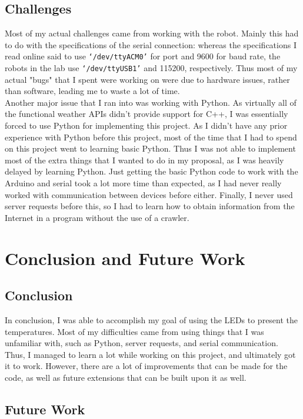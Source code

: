\documentclass[12pt]{article}
\begin{document}
\subsection{Challenges}
Most of my actual challenges came from working with the robot. Mainly this had to do with the specifications of the serial connection: whereas the specifications I read online said to use \texttt{`/dev/ttyACM0'} for port and 9600 for baud rate, the robots in the lab use \texttt{`/dev/ttyUSB1'} and 115200, respectively. Thus most of my actual "bugs" that I spent were working on were due to hardware issues, rather than software, leading me to waste a lot of time.\\
\indent Another major issue that I ran into was working with Python. As virtually all of the functional weather APIs didn't provide support for C++, I was essentially forced to use Python for implementing this project. As I didn't have any prior experience with Python before this project, most of the time that I had to spend on this project went to learning basic Python. Thus I was not able to implement most of the extra things that I wanted to do in my proposal, as I was heavily delayed by learning Python. Just getting the basic Python code to work with the Arduino and serial took a lot more time than expected, as I had never really worked with communication between devices before either. Finally, I never used server requests before this, so I had to learn how to obtain information from the Internet in a program without the use of a crawler.


\section{Conclusion and Future Work}

\subsection{Conclusion}
In conclusion, I was able to accomplish my goal of using the LEDs to present the temperatures. Most of my difficulties came from using things that I was unfamiliar with, such as Python, server requests, and serial communication. Thus, I managed to learn a lot while working on this project, and ultimately got it to work. However, there are a lot of improvements that can be made for the code, as well as future extensions that can be built upon it as well.

\subsection{Future Work}
\end{document}
